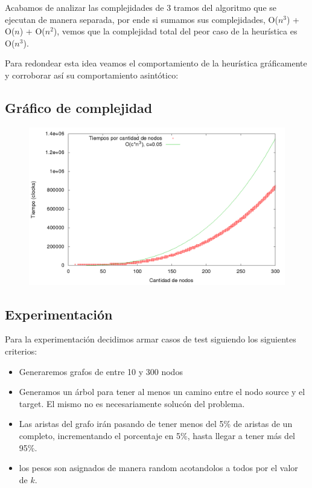 Acabamos de analizar las complejidades de 3 tramos del algoritmo que se ejecutan de manera separada, por ende si sumamos sus complejidades, O($n^3$) + O($n$) + O($n^2$), vemos que la complejidad total del peor caso de la heur\'istica es O($n^3$).

Para redondear esta idea veamos el comportamiento de la heur\'istica gr\'aficamente y corroborar as\'i su comportamiento asint\'otico:

\subsection{Gr\'afico de complejidad}
\begin{figure}[!hp]
	\centering
 	\includegraphics[scale=0.3]{img/greedy_time.png}
\end{figure}




\newpage
\subsection{Experimentaci\'on}

Para la experimentaci\'on decidimos armar casos de test siguiendo los siguientes criterios:

\begin{itemize}
\item Generaremos grafos de entre 10 y 300 nodos
\item Generamos un \'arbol para tener al menos un camino entre el nodo source y el target. El mismo no es necesariamente soluc\'on del problema.
\item Las aristas del grafo ir\'an pasando de tener menos del 5\% de aristas de un completo, incrementando el porcentaje en 5\%, hasta llegar a tener m\'as del 95\%.
\item los pesos son asignados de manera random acotandolos a todos por el valor de $k$.
\end{itemize}


